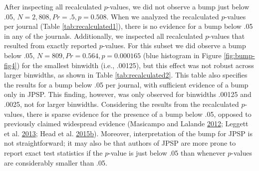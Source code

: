 \documentclass[a5paper]{book}
\begin{document}
After inspecting all recalculated \(p\)-values, we did not observe a
bump just below .05, \(N=2,808,Pr=.5,p=0.508\). When we analyzed the
recalculated \(p\)-values per journal (Table \ref{tab:recalculated1}),
there is no evidence for a bump below .05 in any of the journals.
Additionally, we inspected all recalculated \(p\)-values that resulted
from exactly reported \(p\)-values. For this subset we did observe a
bump below .05, \(N=809,Pr=0.564,p=0.000165\) (blue histogram in Figure
\ref{fig:bump-fig4}) for the smallest binwidth (i.e., .00125), but this
effect was not robust across larger binwidths, as shown in Table
\ref{tab:recalculated2}. This table also specifies the results for a
bump below .05 per journal, with sufficient evidence of a bump only in
JPSP. This finding, however, was only observed for binwidths .00125 and
.0025, not for larger binwidths. Considering the results from the
recalculated \(p\)-values, there is sparse evidence for the presence of
a bump below .05, opposed to previously claimed widespread evidence
(Masicampo and Lalande
\protect\hyperlink{ref-doi:10.1080ux2f17470218.2012.711335}{2012};
Leggett et al.
\protect\hyperlink{ref-doi:10.1080ux2f17470218.2013.863371}{2013}; Head
et al.
\protect\hyperlink{ref-doi:10.1371ux2fjournal.pbio.1002106}{2015}\protect\hyperlink{ref-doi:10.1371ux2fjournal.pbio.1002106}{b}).
Moreover, interpretation of the bump for JPSP is not straightforward; it
may also be that authors of JPSP are more prone to report exact test
statistics if the \(p\)-value is just below .05 than whenever
\(p\)-values are considerably smaller than .05.
\end{document}

